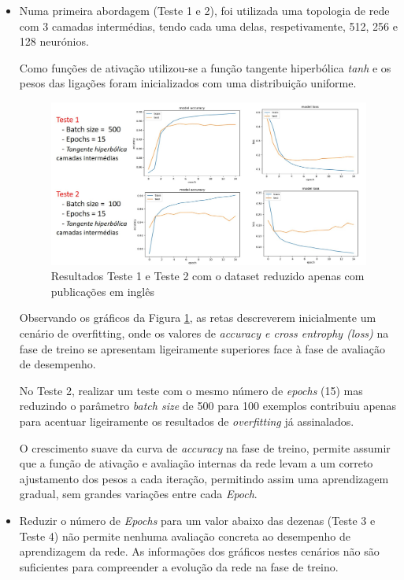 \begin{itemize}
    \item Numa primeira abordagem (Teste 1 e 2), foi utilizada uma topologia de rede com 3 camadas intermédias, tendo cada uma delas, respetivamente, 512, 256 e 128 neurónios. 

    Como funções de ativação utilizou-se a função tangente hiperbólica \textit{tanh} e os pesos das ligações foram inicializados com uma distribuição uniforme. 
    
    \begin{figure}[H]
        \hspace{-0.4in}
        \includegraphics[scale=0.67]{Imagens/teste1.jpg}
        \caption{Resultados Teste 1 e Teste 2 com o dataset reduzido apenas com publicações em inglês}
        \label{fig:teste2}
    \end{figure}
    
    Observando os gráficos da Figura \ref{fig:teste2}, as retas descreverem inicialmente um cenário de overfitting, onde os valores de \textit{accuracy e cross entrophy (loss)} na fase de treino se apresentam ligeiramente superiores face à fase de avaliação de desempenho. 

    No Teste 2, realizar um teste com o mesmo número de \textit{epochs} (15) mas reduzindo o parâmetro \textit{batch size} de 500 para 100 exemplos contribuiu apenas para acentuar ligeiramente os resultados de \textit{overfitting} já assinalados. 
    
    O crescimento suave da curva de \textit{accuracy} na fase de treino, permite assumir que a função de ativação e avaliação internas da rede levam a um correto ajustamento dos pesos a cada iteração, permitindo assim uma aprendizagem gradual, sem grandes variações entre cada \textit{Epoch}.
    
    \item Reduzir o número de \textit{Epochs} para um valor abaixo das dezenas (Teste 3 e Teste 4) não permite nenhuma avaliação concreta ao desempenho de aprendizagem da rede. 
    As informações dos gráficos nestes cenários não são suficientes para compreender a evolução da rede na fase de treino. 
    

\end{itemize}
